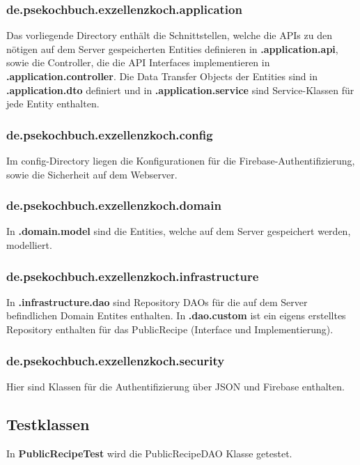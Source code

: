 \subsubsection{\textbf{de.psekochbuch.exzellenzkoch.application}}
Das vorliegende Directory enthält die Schnittstellen, welche die APIs zu den nötigen auf dem Server gespeicherten Entities definieren in \textbf{.application.api}, sowie die Controller, die die API Interfaces implementieren in \textbf{.application.controller}. Die Data Transfer Objects der Entities sind in \textbf{.application.dto} definiert und in \textbf{.application.service} sind Service-Klassen für jede Entity enthalten.

\subsubsection{\textbf{de.psekochbuch.exzellenzkoch.config}}
Im config-Directory liegen die Konfigurationen für die Firebase-Authentifizierung, sowie die Sicherheit auf dem Webserver.

\subsubsection{\textbf{de.psekochbuch.exzellenzkoch.domain}}
In \textbf{.domain.model} sind die Entities, welche auf dem Server gespeichert werden, modelliert.

\subsubsection{\textbf{de.psekochbuch.exzellenzkoch.infrastructure}}
In \textbf{.infrastructure.dao} sind Repository DAOs für die auf dem Server befindlichen Domain Entites enthalten. In \textbf{.dao.custom} ist ein eigens erstelltes Repository enthalten für das PublicRecipe (Interface und Implementierung).

\subsubsection{\textbf{de.psekochbuch.exzellenzkoch.security}}
Hier sind Klassen für die Authentifizierung über JSON und Firebase enthalten.

\subsection{Testklassen}
In \textbf{PublicRecipeTest} wird die PublicRecipeDAO Klasse getestet.

